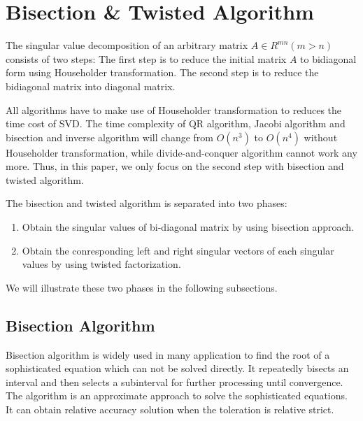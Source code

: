 \section{Bisection \& Twisted Algorithm}
The singular value decomposition of an arbitrary matrix $A\in R^{mn} (m>n)$ consists of two steps:
The first step is to reduce the initial matrix $A$ to bidiagonal form using Householder transformation.
The second step is to reduce the bidiagonal matrix into diagonal matrix.

All algorithms have to make use of Householder transformation to reduces the time cost of SVD.
The time complexity of QR algorithm, Jacobi algorithm and bisection and inverse algorithm will change from $O(n^3)$ to $O(n^4)$ without Householder transformation, while divide-and-conquer algorithm cannot work any more.
Thus, in this paper, we only focus on the second step with bisection and twisted algorithm.

The bisection and twisted algorithm is separated into two phases:
\begin{enumerate}
\item Obtain the singular values of bi-diagonal matrix by using bisection approach.
\item Obtain the conresponding left and right singular vectors of each singular values by using twisted factorization.
\end{enumerate}
We will illustrate these two phases in the following subsections.

\subsection{Bisection Algorithm}
Bisection algorithm is widely used in many application to find the root of a sophisticated equation which can not be solved directly.
It repeatedly bisects an interval and then selects a subinterval for further processing until convergence.
The algorithm is an approximate approach to solve the sophisticated equations.
It can obtain relative accuracy solution when the toleration is relative strict.

